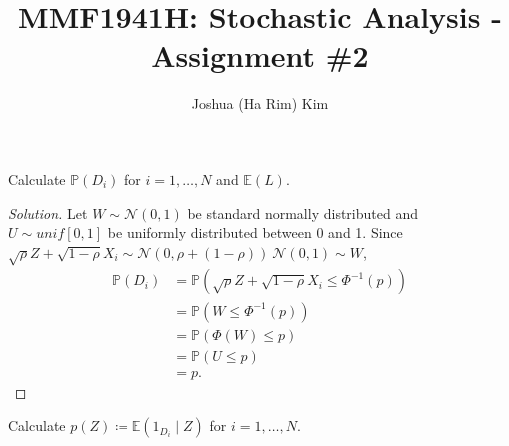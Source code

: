 \documentclass[10pt]{article}
\newcommand{\E}{\mathbb{E}}
\newenvironment{problem}[2][Problem]{\begin{trivlist}
\item[\hskip \labelsep {\bfseries #1}\hskip \labelsep {\bfseries #2.}]}{\end{trivlist}}
\begin{document}
\title{MMF1941H: Stochastic Analysis - Assignment \#2}
\author{Joshua (Ha Rim) Kim}
\maketitle



\begin{problem}{1}
    Calculate $\mathbb{P}(D_i)$ for $i = 1, \ldots, N$ and $\E(L)$.
\end{problem}

\begin{proof}[Solution]
    Let $W \sim \mathcal{N}(0, 1)$ be standard normally distributed and $U \sim unif[0,1]$ be uniformly distributed between 0 and 1.
    Since $\sqrt{\rho} Z + \sqrt{1 - \rho} X_i \sim \mathcal{N}(0, \rho + (1 - \rho)) ~ \mathcal{N}(0,1) \sim W$,
    \begin{align*}
        \mathbb{P}(D_i) &= \mathbb{P}(\sqrt{\rho} Z + \sqrt{1 - \rho} X_i \leq \Phi^{-1}(p)) \\
        &= \mathbb{P}(W \leq \Phi^{-1}(p)) \\
        &= \mathbb{P}(\Phi(W) \leq p) \\
        &= \mathbb{P}(U \leq p) \\
        &= p.
    \end{align*}
\end{proof}



\begin{problem}{2}
    Calculate $p(Z) \coloneq \E(1_{D_i} \mid Z)$ for $i = 1, \ldots, N$.
\end{problem}
\end{document}
